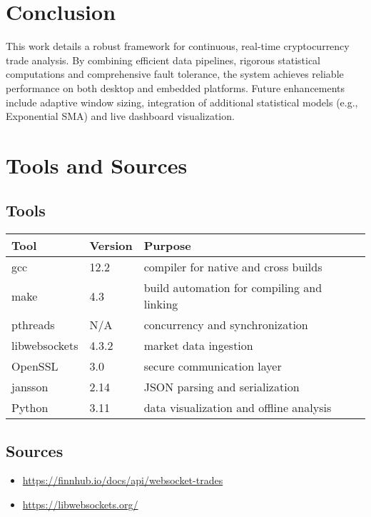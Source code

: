 \documentclass{article}
\begin{document}
\section{Conclusion}
This work details a robust framework for continuous, real-time cryptocurrency trade analysis. By combining efficient data pipelines, rigorous statistical computations and comprehensive fault tolerance, the system achieves reliable performance on both desktop and embedded platforms. Future enhancements include adaptive window sizing, integration of additional statistical models (e.g., Exponential SMA) and live dashboard visualization.

\section{Tools and Sources}

\subsection*{Tools}
\begin{tabularx}{\textwidth}{llX}
\toprule
Tool & Version & Purpose \\
\midrule
gcc           & 12.2  & compiler for native and cross builds \\
make          & 4.3   & build automation for compiling and linking \\
pthreads      & N/A   & concurrency and synchronization \\
libwebsockets & 4.3.2 & market data ingestion \\
OpenSSL       & 3.0   & secure communication layer \\
jansson       & 2.14  & JSON parsing and serialization \\
Python        & 3.11  & data visualization and offline analysis \\
\bottomrule
\end{tabularx}

\vspace{1em}

\subsection*{Sources}
\begin{itemize}
  \item \url{https://finnhub.io/docs/api/websocket-trades}
  \item \url{https://libwebsockets.org/}
\end{itemize}
\end{document}
